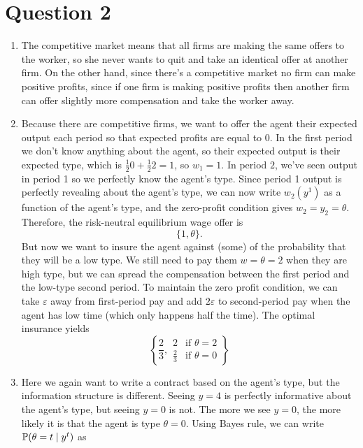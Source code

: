 \section{Question 2}
\begin{enumerate}[label=\alph*)]
\item The competitive market means that all firms are making the same offers to the worker, so she never wants to quit and take an identical offer at another firm. On the other hand, since there's a competitive market no firm can make positive profits, since if one firm is making positive profits then another firm can offer slightly more compensation and take the worker away.
\item Because there are competitive firms, we want to offer the agent their expected output each period so that expected profits are equal to $0$. In the first period we don't know anything about the agent, so their expected output is their expected type, which is $\frac{1}{2} 0 + \frac{1}{2} 2 = 1$, so $w_1 = 1$. In period $2$, we've seen output in period 1 so we perfectly know the agent's type. Since period 1 output is perfectly revealing about the agent's type, we can now write $w_2(y^1)$ as a function of the agent's type, and the zero-profit condition gives $w_2 = y_2 = \theta$. Therefore, the risk-neutral equilibrium wage offer is
  \[
\{1, \theta\}.
  \]
  But now we want to insure the agent against (some) of the probability that they will be a low type. We still need to pay them $w = \theta = 2$ when they are high type, but we can spread the compensation between the first period and the low-type second period. To maintain the zero profit condition, we can take $\varepsilon$ away from first-period pay and add $2 \varepsilon$ to second-period pay when the agent has low time (which only happens half the time). The optimal insurance yields
  \[
    \left\{\frac{2}{3}, 
        \begin{array}{ll}
          2 &\text{if } \theta = 2\\
          \frac{2}{3} &\text{if } \theta = 0
        \end{array}
      \right\}
  \]
\item Here we again want to write a contract based on the agent's type, but the information structure is different. Seeing $y = 4$ is perfectly informative about the agent's type, but seeing $y = 0$ is not. The more we see $y = 0$, the more likely it is that the agent is type $\theta = 0$. Using Bayes rule, we can write $\mathbb{P}(\theta = t \mid y^t)$ as
  \begin{align*}

\end{align*}
\end{enumerate}
